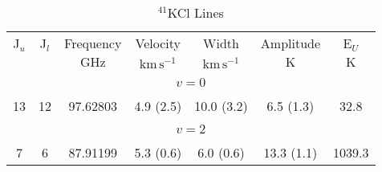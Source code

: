 \begin{table*}[htp]
\centering
\caption{$^{41}$KCl Lines}
\begin{tabular}{ccccccc}
\label{tab:41KCl_salt_lines}
 J$_u$ & J$_l$ & Frequency & Velocity & Width & Amplitude & E$_U$ \\
  &  & $\mathrm{GHz}$ & $\mathrm{km\,s^{-1}}$ & $\mathrm{km\,s^{-1}}$ & $\mathrm{K}$ & $\mathrm{K}$ \\
\hline
&\vspace{-0.75em}\\
\multicolumn{7}{c}{$v = 0$} \\
\vspace{-0.75em}\\
 13 & 12 & 97.62803 & 4.9 (2.5) & 10.0 (3.2) & 6.5 (1.3) & 32.8 \\
&\vspace{-0.75em}\\
\multicolumn{7}{c}{$v = 2$} \\
\vspace{-0.75em}\\
 7 & 6 & 87.91199 & 5.3 (0.6) & 6.0 (0.6) & 13.3 (1.1) & 1039.3 \\
\hline
\end{tabular}

\par 
\end{table*}
